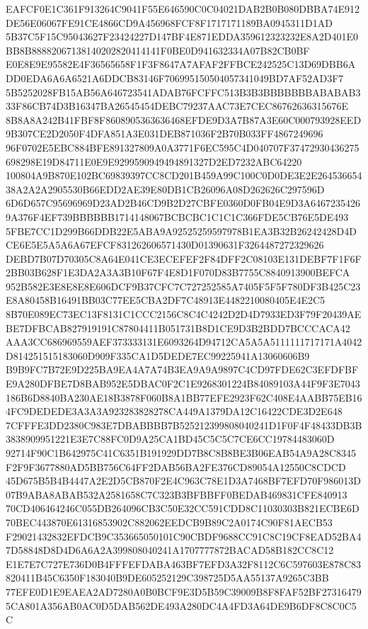 \documentclass[UTF8,fontset=fandol,zihao=-4,a4paper]{ctexart}
\begin{document}
{{EAFCF0E1C361F913264C9041F55E646590C0C04021DAB2B0B080DBBA74E912DE56E06067FE91CE4866CD9A456968FCF8F1717171189BA0945311D1AD
5B37C5F15C95043627F23424227D147BF4E871EDDA359612323232E8A2D401E0BB8B88882067138140202820414141F0BE0D941632334A07B82CB0BF
E0E8E9E95582E4F36565658F1F3F8647A7AFAF2FFBCE242525C13D69DBB6ADD0EDA6A6A6521A6DDCB83146F706995150504057341049BD7AF52AD3F7
5B5252028FB15AB56A646723541ADAB76FCFFC513B3B3BBBBBBBABABAB333F86CB74D3B16347BA26545454DEBC79237AAC73E7CEC86762636315676E
8B8A8A242B41FBF8F8608905363636468EFDE9D3A7B87A3E60C000793928EED9B307CE2D2050F4DFA851A3E031DEB871036F2B70B033FF4867249696
96F0702E5EBC884BFE891327809A0A3771F6EC595C4D040707F37472930436275698298E19D84711E0E9E9299590949494891327D2ED7232ABC64220
100804A9B870E102BC69839397CC8CD201B459A99C100C0D0DE3E2E26453665438A2A2A2905530B66EDD2AE39E80DB1CB26096A08D262626C297596D
6D6D657C95696969D23AD2B46CD9B2D27CBFE0360D0FB04E9D3A64672354269A376F4EF739BBBBBB1714148067BCBCBC1C1C1C366FDE5CB76E5DE493
5FBE7CC1D299B66DDB22E5ABA9A92525259597978B1EA3B32B26242428D4DCE6E5E5A5A6A67EFCF831262606571430D01390631F3264487272329626
DEBD7B07D70305C8A64E041CE3ECEFEF2F84DFF2C08103E131DEBF7F1F6F2BB03B628F1E3DA2A3A3B10F67F4E8D1F070D83B7755C8840913900BEFCA
952B582E3E8E8E8E606DCF9B37CFC7C727252585A7405F5F5F780DF3B425C23E8A80458B16491BB03C77EE5CBA2DF7C48913E4482210080405E4E2C5
8B70E089EC73EC13F8131C1CCC2156C8C4C4242D2D4D7933ED3F79F20439AEBE7DFBCAB827919191C87804411B051731B8D1CE9D3B2BDD7BCCCACA42
AAA3CC686969559AEF373333131E6093264D94712CA5A5A5111111717171A4042D814251515183060D909F335CA1D5DEDE7EC99225941A13060606B9
B9B9FC7B72E9D225BA9EA4A7A74B3EA9A9A9897C4CD97FDE62C3EFDFBFE9A280DFBE7D8BAB952E5DBAC0F2C1E9268301224B84089103A44F9F3E7043
186B6D8840BA230AE18B3878F060B8A1BB77EFE2923F62C408E4AABB75EB164FC9DEDEDE3A3A3A923283828278CA449A1379DA12C16422CDE3D2E648
7CFFFE3DD2380C983E7DBABBBB7B525212399808040241D1F0F4F48433DB3B3838909951221E3E7C88FC0D9A25CA1BD45C5C5C7CE6CC19784483060D
92714F90C1B642975C41C6351B191929DD7B8C8B8BE3B06EAB54A9A28C8345F2F9F3677880AD5BB756C64FF2DAB56BA2FE376CD89054A12550C8CDCD
45D675B5B4B4447A2E2D5CB870F2E4C963C78E1D3A7468BF7EFD70F986013D07B9ABA8ABAB532A2581658C7C323B3BFBBFF0BEDAB469831CFE840913
70CD406464246C055DB264096CB3C50E32CC591CDD8C11030303B821ECBE6D70BEC443870E61316853902C882062EEDCB9B89C2A0174C90F81AECB53
F29021432832EFDCB9C353665050101C90CBDF9688CC91C8C19CF8EAD52BA47D58848D8D4D6A6A2A399808040241A1707777872BACAD58B182CC8C12
E1E7E7C727E736D0B4FFFEFDABA463BF7EFD3A32F8112C6C597603E878C83820411B45C6350F183040B9DE605252129C398725D5AA55137A9265C3BB
77EFE0D1E9EAEA2AD7280A0B0BCF9E3D5B59C39009B8F8FAF52BF273164795CA801A356AB0AC0D5DAB562DE493A280DC4A4FD3A64DE9B6DF8C8C0C5C
}}
\end{document}
